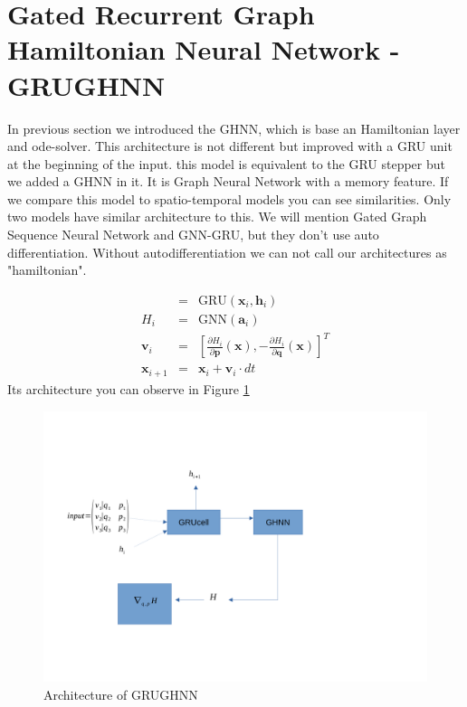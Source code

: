  

 



\section{Gated Recurrent Graph Hamiltonian Neural Network - GRUGHNN}
In previous section we introduced the GHNN, which is base an Hamiltonian layer and ode-solver. This architecture is not different but improved with a GRU unit at the beginning of the input. this model is equivalent to the GRU stepper but we added a GHNN in it. It is Graph Neural Network with a memory feature. If we compare this model to spatio-temporal models you can see similarities. Only two models have similar architecture to this. We will mention Gated Graph Sequence Neural Network\cite{GGSNN} and GNN-GRU\cite{gnngru}, but they don't use auto differentiation. Without autodifferentiation we can not call our architectures as "hamiltonian". 

\begin{eqnarray}
	[\mathbf{a}_i, \mathbf{h}_{i+1}] &=&  \text{GRU}(\mathbf{x}_i,\mathbf{h}_i)\\
	 H_i&=& \text{GNN}(\mathbf{a}_i)\\
	 \mathbf{v}_i&=&\left[\frac{\partial H_{i}}{\partial\mathbf{p}}(\mathbf{x}),-\frac{\partial H_{i}}{\partial\mathbf{q}}(\mathbf{x})\right]^T\\
	 \mathbf{x}_{i+1} &=& \mathbf{x}_i + \mathbf{v}_i \cdot dt
\end{eqnarray}
Its architecture you can observe in Figure \ref{GRUGHNN}
\begin{figure}[h!]
	\includegraphics[width=15cm]{chapters/chapter4/GRUGHNN}
	
	\caption{Architecture of GRUGHNN}
	\label{GRUGHNN}
\end{figure}
